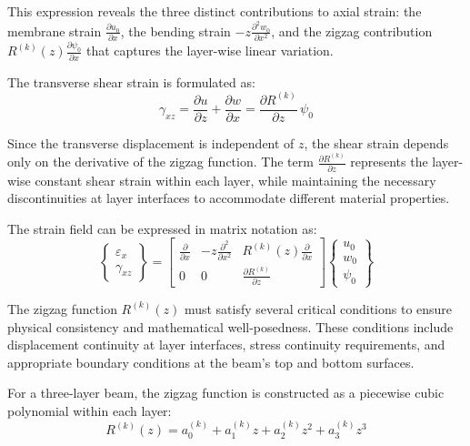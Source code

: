 \documentclass[12pt,a4paper]{report}
\begin{document}
This expression reveals the three distinct contributions to axial strain: the membrane strain 
$\frac{\partial u_0}{\partial x}$, the bending strain 
$- z \frac{\partial^2 w_0}{\partial x^2}$, and the zigzag contribution 
$R^{(k)}(z) \frac{\partial \psi_0}{\partial x}$ that captures the layer-wise linear variation.

The transverse shear strain is formulated as:
\begin{equation}
\gamma_{xz} = \frac{\partial u}{\partial z} + \frac{\partial w}{\partial x} 
= \frac{\partial R^{(k)}}{\partial z} \, \psi_0 
\end{equation}

Since the transverse displacement is independent of $z$, the shear strain depends only on the derivative of the zigzag function. The term 
$\frac{\partial R^{(k)}}{\partial z}$ represents the layer-wise constant shear strain within each layer, while maintaining the necessary discontinuities at layer interfaces to accommodate different material properties.

The strain field can be expressed in matrix notation as:
\begin{equation}
\begin{Bmatrix} \varepsilon_x \\ \gamma_{xz} \end{Bmatrix} =
\begin{bmatrix} 
\frac{\partial}{\partial x} & -z \frac{\partial^2}{\partial x^2} & R^{(k)}(z) \frac{\partial}{\partial x} \\
0 & 0 & \frac{\partial R^{(k)}}{\partial z} 
\end{bmatrix}
\begin{Bmatrix} u_0 \\ w_0 \\ \psi_0 \end{Bmatrix}
\end{equation}


The zigzag function $R^{(k)}(z)$ must satisfy several critical conditions to ensure physical consistency and mathematical well-posedness. These conditions include displacement continuity at layer interfaces, stress continuity requirements, and appropriate boundary conditions at the beam's top and bottom surfaces.

For a three-layer beam, the zigzag function is constructed as a piecewise cubic polynomial within each layer:
\begin{equation}
R^{(k)}(z) = a_0^{(k)} + a_1^{(k)} z + a_2^{(k)} z^2 + a_3^{(k)} z^3
\end{equation}
\end{document}
